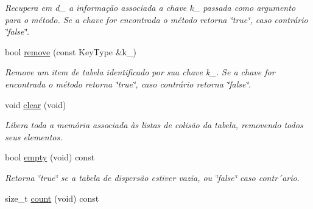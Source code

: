 \begin{DoxyCompactItemize}
\begin{DoxyCompactList}\small\item\em Recupera em d\+\_\+ a informação associada a chave k\+\_\+ passada como argumento para o método. Se a chave for encontrada o método retorna \char`\"{}true\char`\"{}, caso contrário \char`\"{}false\char`\"{}. \end{DoxyCompactList}\item 
bool \hyperlink{classMyHashTable_1_1HashTbl_aa2219c57c12f267549c855d96fcf4753}{remove} (const Key\+Type \&k\+\_\+)\hypertarget{classMyHashTable_1_1HashTbl_aa2219c57c12f267549c855d96fcf4753}{}\label{classMyHashTable_1_1HashTbl_aa2219c57c12f267549c855d96fcf4753}

\begin{DoxyCompactList}\small\item\em Remove um item de tabela identificado por sua chave k\+\_\+. Se a chave for encontrada o método retorna \char`\"{}true\char`\"{}, caso contrário retorna \char`\"{}false\char`\"{}. \end{DoxyCompactList}\item 
void \hyperlink{classMyHashTable_1_1HashTbl_aeb6c0f3da5e26f134586f5a6b13e6d5d}{clear} (void)\hypertarget{classMyHashTable_1_1HashTbl_aeb6c0f3da5e26f134586f5a6b13e6d5d}{}\label{classMyHashTable_1_1HashTbl_aeb6c0f3da5e26f134586f5a6b13e6d5d}

\begin{DoxyCompactList}\small\item\em Libera toda a memória associada às listas de colisão da tabela, removendo todos seus elementos. \end{DoxyCompactList}\item 
bool \hyperlink{classMyHashTable_1_1HashTbl_ac7f287d3ddfc6dcfc64ff5801aef782f}{empty} (void) const \hypertarget{classMyHashTable_1_1HashTbl_ac7f287d3ddfc6dcfc64ff5801aef782f}{}\label{classMyHashTable_1_1HashTbl_ac7f287d3ddfc6dcfc64ff5801aef782f}

\begin{DoxyCompactList}\small\item\em Retorna \char`\"{}true\char`\"{} se a tabela de dispersão estiver vazia, ou \char`\"{}false\char`\"{} caso contr´ario. \end{DoxyCompactList}\item 
size\+\_\+t \hyperlink{classMyHashTable_1_1HashTbl_af7db7123f95369ca2a7d831da1b6170d}{count} (void) const \hypertarget{classMyHashTable_1_1HashTbl_af7db7123f95369ca2a7d831da1b6170d}{}\label{classMyHashTable_1_1HashTbl_af7db7123f95369ca2a7d831da1b6170d}


\end{DoxyCompactItemize}
